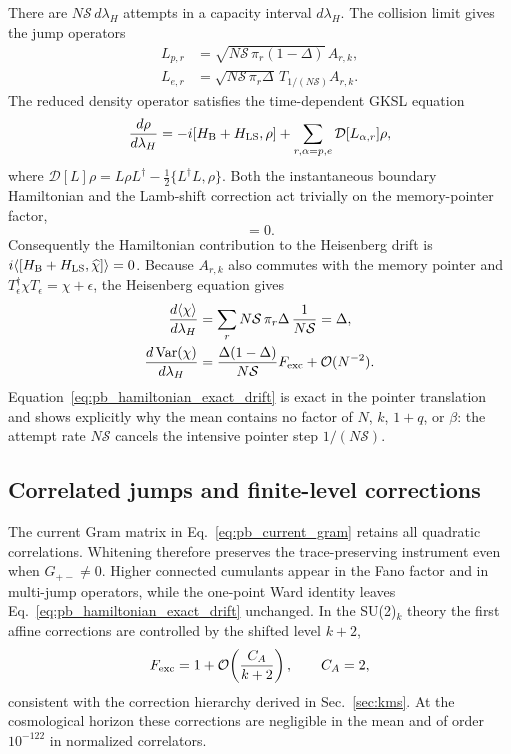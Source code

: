 \documentclass[aps,prd,twocolumn,10pt,superscriptaddress,nofootinbib]{revtex4-2}
\begin{document}
There are $N\mathcal S\,d\lambda_H$ attempts in a capacity interval
$d\lambda_H$.  The collision limit gives the jump operators
\begin{align}
 L_{p,r}&=\sqrt{N\mathcal S\,\pi_r(1-\Delta)}\,A_{r,k},
 \label{eq:pb_processed_jump}\\
 L_{e,r}&=\sqrt{N\mathcal S\,\pi_r\Delta}\,
 T_{1/(N\mathcal S)}A_{r,k}.
 \label{eq:pb_excess_jump}
\end{align}
The reduced density operator satisfies the time-dependent GKSL equation
\cite{Lindblad1976}
\begin{equation}
 \frac{d\rho}{d\lambda_H}
 =-i[H_{\rm B}+H_{\rm LS},\rho]
 +\sum_{r,\alpha=p,e}\mathcal D[L_{\alpha,r}]\rho,
 \label{eq:pb_gksl}
\end{equation}
where
$\mathcal D[L]\rho=L\rho L^{\dagger}-\tfrac12\{L^{\dagger}L,\rho\}$.
Both the instantaneous boundary Hamiltonian and the Lamb-shift correction
act trivially on the memory-pointer factor,
\begin{equation}
 [H_{\rm B}+H_{\rm LS},\widehat\chi]=0.
 \label{eq:pb_pointer_neutral_hamiltonian}
\end{equation}
Consequently the Hamiltonian contribution to the Heisenberg drift is
$i\langle[H_{\rm B}+H_{\rm LS},\widehat\chi]\rangle=0$.  Because
$A_{r,k}$ also commutes with the memory pointer and
$T_{\epsilon}^{\dagger}\chi T_{\epsilon}=\chi+\epsilon$, the Heisenberg
equation gives
\begin{align}
 \frac{d\langle\chi\rangle}{d\lambda_H}
 &=\sum_r N\mathcal S\,\pi_r\Delta\,
 \frac{1}{N\mathcal S}
 =\Delta,
 \label{eq:pb_hamiltonian_exact_drift}\\
 \frac{d\,\mathrm{Var}(\chi)}{d\lambda_H}
 &=\frac{\Delta(1-\Delta)}{N\mathcal S}
 F_{\rm exc}+\mathcal O(N^{-2}).
 \label{eq:pb_hamiltonian_exact_noise}
\end{align}
Equation~\eqref{eq:pb_hamiltonian_exact_drift} is exact in the pointer
translation and shows explicitly why the mean contains no factor of $N$,
$k$, $1+q$, or $\beta$: the attempt rate $N\mathcal S$ cancels the
intensive pointer step $1/(N\mathcal S)$.

\subsection{Correlated jumps and finite-level corrections}

The current Gram matrix in Eq.~\eqref{eq:pb_current_gram} retains all
quadratic correlations.  Whitening therefore preserves the trace-preserving
instrument even when $G_{+-}\neq0$.  Higher connected cumulants appear in
the Fano factor and in multi-jump operators, while the one-point Ward
identity leaves Eq.~\eqref{eq:pb_hamiltonian_exact_drift} unchanged.  In the
SU(2)$_k$ theory the first affine corrections are controlled by the shifted
level $k+2$,
\begin{equation}
 F_{\rm exc}=1+\mathcal O\!\left(\frac{C_A}{k+2}\right),
 \qquad C_A=2,
 \label{eq:pb_finite_k_fano}
\end{equation}
consistent with the correction hierarchy derived in
Sec.~\ref{sec:kms}.  At the cosmological horizon these corrections
are negligible in the mean and of order $10^{-122}$ in normalized
correlators.
\end{document}

